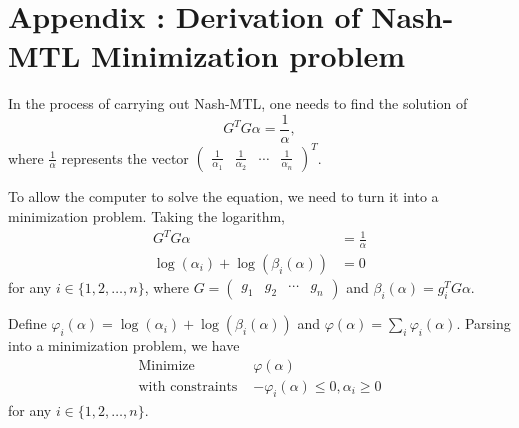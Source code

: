 \documentclass{article}
\renewcommand{\|}{\biggr|}
\begin{document}
    \section{Appendix : Derivation of Nash-MTL Minimization problem}
    In the process of carrying out Nash-MTL, one needs to find the solution of
    \begin{equation*}
    G^T G \alpha = \frac{1}{\alpha},
    \end{equation*}
    where $\frac{1}{\alpha}$ represents the vector $\begin{pmatrix} \frac{1}{\alpha_1} & \frac{1}{\alpha_2} & \cdots & \frac{1}{\alpha_n} \end{pmatrix}^T$.

    To allow the computer to solve the equation, we need to turn it into a minimization problem. Taking the logarithm,
    \begin{align*}
    G^T G \alpha &= \frac{1}{\alpha} \\
    \log(\alpha_i) + \log(\beta_i(\alpha)) &= 0
    \end{align*}
    for any $i \in \{1, 2, \dots, n\}$, where $G = \begin{pmatrix} g_1 & g_2 & \cdots & g_n \end{pmatrix}$ and $\beta_i(\alpha) = g_i^T G \alpha$.

    Define $\varphi_i(\alpha) = \log(\alpha_i) + \log(\beta_i(\alpha))$ and $\varphi(\alpha) = \sum_i \varphi_i(\alpha)$. Parsing into a minimization problem, we have
    \begin{align*}
    \text{Minimize } & \varphi(\alpha) \\
    \text{with constraints } & -\varphi_i(\alpha) \leq 0, \alpha_i \geq 0
    \end{align*}
    for any $i \in \{1, 2, \dots, n\}$.
\end{document}
